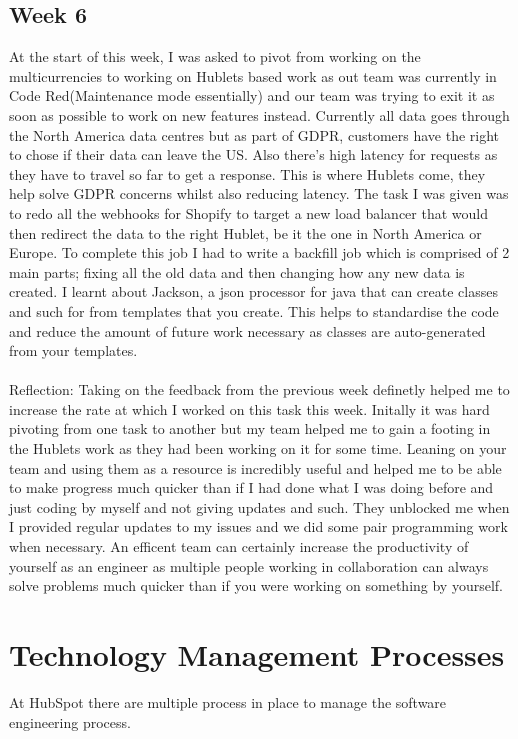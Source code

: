 \documentclass[11pt]{article} %
\begin{document}
\subsection{Week 6}
At the start of this week, I was asked to pivot from working on the multicurrencies to working on Hublets based work as out team was currently in Code Red(Maintenance mode essentially) and our team was trying to exit it as soon as possible to work on new features instead. Currently all data goes through the North America data centres but as part of GDPR, customers have the right to chose if their data can leave the US. Also there's high latency for requests as they have to travel so far to get a response. This is where Hublets come, they help solve GDPR concerns whilst also reducing latency. The task I was given was to redo all the webhooks for Shopify to target a new load balancer that would then redirect the data to the right Hublet, be it the one in North America or Europe. To complete this job I had to write a backfill job which is comprised of 2 main parts; fixing all the old data and then changing how any new data is created. I learnt about Jackson, a json processor for java that can create classes and such for from templates that you create. This helps to standardise the code and reduce the amount of future work necessary as classes are auto-generated from your templates. 
\\\\
Reflection: Taking on the feedback from the previous week definetly helped me to increase the rate at which I worked on this task this week. Initally it was hard pivoting from one task to another but my team helped me to gain a footing in the Hublets work as they had been working on it for some time. Leaning on your team and using them as a resource is incredibly useful and helped me to be able to make progress much quicker than if I had done what I was doing before and just coding by myself and not giving updates and such. They unblocked me when I provided regular updates to my issues and we did some pair programming work when necessary. An efficent team can certainly increase the productivity of yourself as an engineer as multiple people working in collaboration can always solve problems much quicker than if you were working on something by yourself.

\newpage
\section{Technology Management Processes}
At HubSpot there are multiple process in place to manage the software engineering process.
\end{document}
